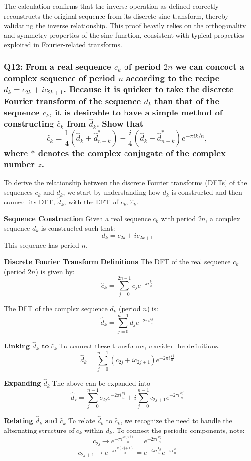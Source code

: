 \documentclass[8pt]{article}
\begin{document}
{The calculation confirms that the inverse operation as defined correctly reconstructs the original sequence from its discrete sine transform, thereby validating the inverse relationship. This proof heavily relies on the orthogonality and symmetry properties of the sine function, consistent with typical properties exploited in Fourier-related transforms.

\subsubsection*{Q12:
From a real sequence \(c_k\) of period \(2n\) we can concoct a complex sequence of period \(n\) according to the recipe \(d_k = c_{2k} + i c_{2k+1}\). Because it is quicker to take the discrete Fourier transform of the sequence \(d_k\) than that of the sequence \(c_k\), it is desirable to have a simple method of constructing \(\hat{c}_k\) from \(\hat{d}_k\). Show that
\[
\hat{c}_k = \frac{1}{4} \left( \hat{d}_k + \hat{d}^*_{n-k} \right) - \frac{i}{4} \left( \hat{d}_k - \hat{d}^*_{n-k} \right) e^{-\pi i k / n},
\]
where \(*\) denotes the complex conjugate of the complex number \(z\).}

To derive the relationship between the discrete Fourier transforms (DFTs) of the sequences \(c_k\) and \(d_k\), we start by understanding how \(d_k\) is constructed and then connect its DFT, \(\hat{d}_k\), with the DFT of \(c_k\), \(\hat{c}_k\).

\textbf{Sequence Construction}
Given a real sequence \(c_k\) with period \(2n\), a complex sequence \(d_k\) is constructed such that:
\[
d_k = c_{2k} + i c_{2k+1}
\]
This sequence has period \(n\).

\textbf{Discrete Fourier Transform Definitions}
The DFT of the real sequence \(c_k\) (period \(2n\)) is given by:
\[
\hat{c}_k = \sum_{j=0}^{2n-1} c_j e^{-\pi i \frac{kj}{n}}
\]

The DFT of the complex sequence \(d_k\) (period \(n\)) is:
\[
\hat{d}_k = \sum_{j=0}^{n-1} d_j e^{-2\pi i \frac{kj}{n}}
\]

\textbf{Linking \(\hat{d}_k\) to \(\hat{c}_k\)}
To connect these transforms, consider the definitions:
\[
\hat{d}_k = \sum_{j=0}^{n-1} (c_{2j} + ic_{2j+1}) e^{-2\pi i \frac{kj}{n}}
\]

\textbf{Expanding \(\hat{d}_k\)}
The above can be expanded into:
\[
\hat{d}_k = \sum_{j=0}^{n-1} c_{2j} e^{-2\pi i \frac{kj}{n}} + i \sum_{j=0}^{n-1} c_{2j+1} e^{-2\pi i \frac{kj}{n}}
\]

\textbf{Relating \(\hat{d}_k\) and \(\hat{c}_k\)}
To relate \(\hat{d}_k\) to \(\hat{c}_k\), we recognize the need to handle the alternating structure of \(c_k\) within \(d_k\). To connect the periodic components, note:
\[
c_{2j} \rightarrow e^{-\pi i \frac{k(2j)}{n}} = e^{-2\pi i \frac{kj}{n}}
\]
\[
c_{2j+1} \rightarrow e^{-\pi i \frac{k(2j+1)}{n}} = e^{-2\pi i \frac{kj}{n}} e^{-\pi i \frac{k}{n}}
\]

}
\end{document}
